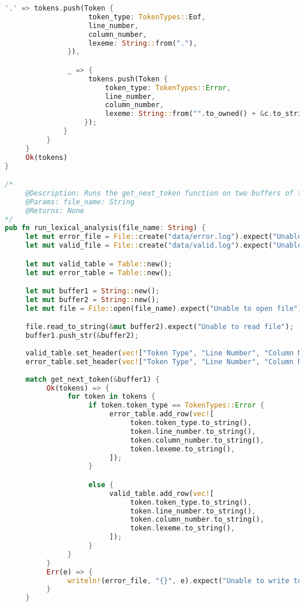 \documentclass[12pt]{article}
\begin{document}
{\begin{lstlisting}[language=Rust]
               '.' => tokens.push(Token {
                    token_type: TokenTypes::Eof,
                    line_number,
                    column_number,
                    lexeme: String::from("."),
               }),

               _ => {
                    tokens.push(Token {
                        token_type: TokenTypes::Error,
                        line_number,
                        column_number,
                        lexeme: String::from("".to_owned() + &c.to_string()),
                   });
              }
          }
     }
     Ok(tokens)
}

/* 
     @Description: Runs the get_next_token function on two buffers of text and writes to file
     @Params: file_name: String
     @Returns: None
*/
pub fn run_lexical_analysis(file_name: String) {
     let mut error_file = File::create("data/error.log").expect("Unable to create file");
     let mut valid_file = File::create("data/valid.log").expect("Unable to create file");

     let mut valid_table = Table::new();
     let mut error_table = Table::new();

     let mut buffer1 = String::new();
     let mut buffer2 = String::new();
     let mut file = File::open(file_name).expect("Unable to open file");

     file.read_to_string(&mut buffer2).expect("Unable to read file");
     buffer1.push_str(&buffer2);
     
     valid_table.set_header(vec!["Token Type", "Line Number", "Column Number", "Lexeme"]);
     error_table.set_header(vec!["Token Type", "Line Number", "Column Number", "Lexeme"]);
     
     match get_next_token(&buffer1) {
          Ok(tokens) => {
               for token in tokens {
                    if token.token_type == TokenTypes::Error {
                         error_table.add_row(vec![
                              token.token_type.to_string(),
                              token.line_number.to_string(),
                              token.column_number.to_string(),
                              token.lexeme.to_string(),
                         ]);
                    }

                    else {
                         valid_table.add_row(vec![
                              token.token_type.to_string(),
                              token.line_number.to_string(),
                              token.column_number.to_string(),
                              token.lexeme.to_string(),
                         ]);
                    }
               }
          }
          Err(e) => {
               writeln!(error_file, "{}", e).expect("Unable to write to file");
          }
     }   
 

\end{lstlisting}}
\end{document}
